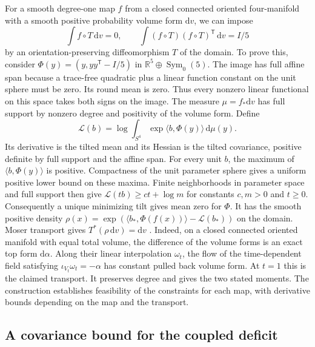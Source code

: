 \documentclass[11pt]{article}
\numberwithin{equation}{section}
\newcommand{\dd}{\mathrm{d}}
\newcommand{\RR}{\mathbb{R}}
\newcommand{\ip}[2]{\langle #1,#2\rangle}
\begin{document}
For a smooth degree-one map \(f\) from a closed connected oriented four-manifold
with a smooth positive probability volume form \(\dd v\),
we can impose
\[
 \int f\circ T\,\dd v=0,\qquad
 \int (f\circ T)(f\circ T)^{\mathsf T}\,\dd v=I/5
\]
by an orientation-preserving diffeomorphism \(T\) of the domain.
To prove this, consider
\(\Phi(y)=(y,yy^{\mathsf T}-I/5)\) in
\(\RR^5\oplus\operatorname{Sym}_0(5)\). The image has full affine
span because a trace-free quadratic plus a linear function
constant on the unit sphere must be zero.
Its round mean is zero. Thus every nonzero linear functional
on this space takes both signs on the image. The measure
\(\mu=f_*\dd v\) has full support by nonzero degree and positivity
of the volume form. Define
\[
 \mathcal L(b)=\log\int_{S^4}\exp\ip{b}{\Phi(y)}\,\dd\mu(y).
\]
Its derivative is the tilted mean and its Hessian is the tilted
covariance, positive definite by full support and the affine span.
For every unit \(b\), the maximum of \(\ip{b}{\Phi(y)}\) is positive.
Compactness of the unit parameter sphere gives a uniform positive
lower bound on these maxima. Finite neighborhoods in parameter
space and full support then give
\(\mathcal L(tb)\ge c t+\log m\) for constants \(c,m>0\) and \(t\ge0\).
Consequently a unique minimizing tilt gives mean zero for \(\Phi\).
It has the smooth positive density
\(\rho(x)=\exp(\ip{b_*}{\Phi(f(x))}-\mathcal L(b_*))\)
on the domain. Moser transport gives \(T^*(\rho\,\dd v)=\dd v\)
\cite{Moser1965Volume}. Indeed, on a closed connected oriented
manifold with equal total volume, the difference of the volume
forms is an exact top form \(\dd\alpha\). Along their linear
interpolation \(\omega_t\), the flow of the time-dependent field
satisfying \(\iota_{V_t}\omega_t=-\alpha\) has constant pulled back
volume form. At \(t=1\) this is the claimed transport. It preserves
degree and gives the two stated moments. The construction
establishes feasibility of the constraints for each map, with
derivative bounds depending on the map and the transport.

\subsection{A covariance bound for the coupled deficit}
\end{document}
